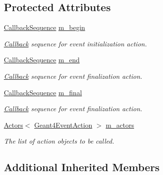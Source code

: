\subsection*{Protected Attributes}
\begin{DoxyCompactItemize}
\item 
\hyperlink{struct_d_d4hep_1_1_callback_sequence}{Callback\+Sequence} \hyperlink{class_d_d4hep_1_1_simulation_1_1_geant4_event_action_sequence_a59a49de5aff7aac8379f5325e2584ad6}{m\+\_\+begin}
\begin{DoxyCompactList}\small\item\em \hyperlink{class_d_d4hep_1_1_callback}{Callback} sequence for event initialization action. \end{DoxyCompactList}\item 
\hyperlink{struct_d_d4hep_1_1_callback_sequence}{Callback\+Sequence} \hyperlink{class_d_d4hep_1_1_simulation_1_1_geant4_event_action_sequence_ae633e2bffea90162cc1081deca8c395c}{m\+\_\+end}
\begin{DoxyCompactList}\small\item\em \hyperlink{class_d_d4hep_1_1_callback}{Callback} sequence for event finalization action. \end{DoxyCompactList}\item 
\hyperlink{struct_d_d4hep_1_1_callback_sequence}{Callback\+Sequence} \hyperlink{class_d_d4hep_1_1_simulation_1_1_geant4_event_action_sequence_af2e1129997fe4ef05c0bf2e16f29cbca}{m\+\_\+final}
\begin{DoxyCompactList}\small\item\em \hyperlink{class_d_d4hep_1_1_callback}{Callback} sequence for event finalization action. \end{DoxyCompactList}\item 
\hyperlink{class_d_d4hep_1_1_simulation_1_1_geant4_action_1_1_actors}{Actors}$<$ \hyperlink{class_d_d4hep_1_1_simulation_1_1_geant4_event_action}{Geant4\+Event\+Action} $>$ \hyperlink{class_d_d4hep_1_1_simulation_1_1_geant4_event_action_sequence_a6b3b349d21a34103e1e070a6488bb0e5}{m\+\_\+actors}
\begin{DoxyCompactList}\small\item\em The list of action objects to be called. \end{DoxyCompactList}\end{DoxyCompactItemize}
\subsection*{Additional Inherited Members}


